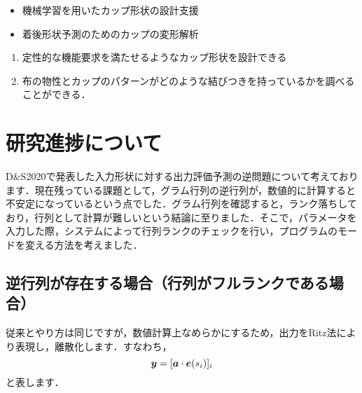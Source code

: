\documentclass[11pt]{jsarticle}
\begin{document}
	\articleSPRabst
		\begin{itemize}
			\item 機械学習を用いたカップ形状の設計支援
			\item 着後形状予測のためのカップの変形解析
		\end{itemize}
		
		
	\articleSPRobj
		\begin{enumerate}
			\item 定性的な機能要求を満たせるようなカップ形状を設計できる
			\item 布の物性とカップのパターンがどのような結びつきを持っているかを調べることができる．
		\end{enumerate}
	\articleSPRitemsone
		
		\tableofcontents
		
		
	\articleSPRitemstwo
	\renewcommand{\labelitemi}{$\blacktriangledown$}
	\newcommand{\argmax}{\mathop{\rm arg~max}\limits}
	\newcommand{\argmin}{\mathop{\rm arg~min}\limits}
	\newcommand{\Ker}{{\rm Ker}}
	\newcommand{\rank}{{\rm rank}}
	\section{研究進捗について}
		D$\&$S2020で発表した入力形状に対する出力評価予測の逆問題について考えております．現在残っている課題として，グラム行列の逆行列が，数値的に計算すると不安定になっているという点でした．グラム行列を確認すると，ランク落ちしており，行列として計算が難しいという結論に至りました．そこで，パラメータを入力した際，システムによって行列ランクのチェックを行い，プログラムのモードを変える方法を考えました．
		\subsection{逆行列が存在する場合（行列がフルランクである場合）}
			従来とやり方は同じですが，数値計算上なめらかにするため，出力をRitz法により表現し，離散化します．すなわち，
			\begin{equation}\label{eq:Yeq}
				\boldsymbol{y} = [\boldsymbol{a}\cdot \boldsymbol{e}(s_i)]_i
			\end{equation}
			と表します．
\end{document}
